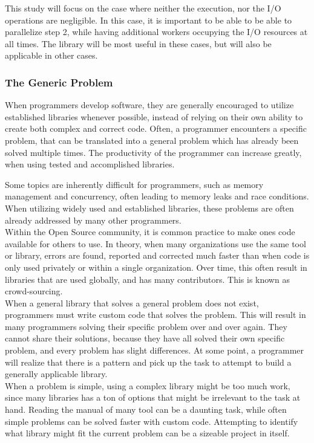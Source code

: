 \documentclass[a4paper]{article}
\begin{document}
This study will focus on the case where neither the execution, nor the I/O operations are negligible. In this case, it is important to be able to be able to parallelize step 2, while having additional workers occupying the I/O resources at all times. The library will be most useful in these cases, but will also be applicable in other cases.


\subsubsection{The Generic Problem}
When programmers develop software, they are generally encouraged to utilize established libraries whenever possible, instead of relying on their own ability to create both complex and correct code. Often, a programmer encounters a specific problem, that can be translated into a general problem which has already been solved multiple times. The productivity of the programmer can increase greatly, when using tested and accomplished libraries. 

Some topics are inherently difficult for programmers, such as memory management and concurrency, often leading to memory leaks and race conditions. When utilizing widely used and established libraries, these problems are often already addressed by many other programmers.\\

Within the Open Source community, it is common practice to make ones code available for others to use. In theory, when many organizations use the same tool or library, errors are found, reported and corrected much faster than when code is only used privately or within a single organization. Over time, this often result in libraries that are used globally, and has many contributors. This is known as crowd-sourcing.\\

When a general library that solves a general problem does not exist, programmers must write custom code that solves the problem. This will result in many programmers solving their specific problem over and over again. They cannot share their solutions, because they have all solved their own specific problem, and every problem has slight differences. At some point, a programmer will realize that there is a pattern and pick up the task to attempt to build a generally applicable library.\\

When a problem is simple, using a complex library might be too much work, since many libraries has a ton of options that might be irrelevant to the task at hand. Reading the manual of many tool can be a daunting task, while often simple problems can be solved faster with custom code. Attempting to identify what library might fit the current problem can be a sizeable project in itself. 
\end{document}
